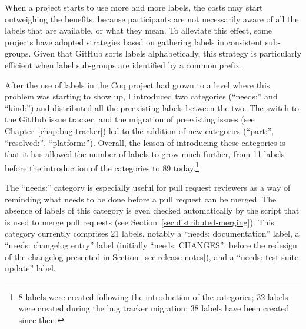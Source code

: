 When a project starts to use more and more labels, the costs may start outweighing the benefits, because participants are not necessarily aware of all the labels that are available, or what they mean. To alleviate this effect, some projects have adopted strategies based on gathering labels in consistent sub-groups. Given that GitHub sorts labels alphabetically, this strategy is particularly efficient when label sub-groups are identified by a common prefix.

After the use of labels in the Coq project had grown to a level where this problem was starting to show up, I introduced two categories (``needs:'' and ``kind:'') and distributed all the preexisting labels between the two.
The switch to the GitHub issue tracker, and the migration of preexisting issues (see Chapter~\ref{chap:bug-tracker}) led to the addition of new categories (``part:'', ``resolved:'', ``platform:''). 
Overall, the lesson of introducing these categories is that it has allowed the number of labels to grow much further, from 11 labels before the introduction of the categories to 89 today.\footnote{
	8 labels were created following the introduction of the categories; 32 labels were created during the bug tracker migration; 38 labels have been created since then.
}

The ``needs:'' category is especially useful for pull request reviewers as a way of reminding what needs to be done before a pull request can be merged. The absence of labels of this category is even checked automatically by the script that is used to merge pull requests (see Section~\ref{sec:distributed-merging}). This category currently comprises 21 labels, notably a ``needs: documentation'' label, a ``needs: changelog entry'' label (initially ``needs: CHANGES'', before the redesign of the changelog presented in Section~\ref{sec:release-notes}), and a ``needs: test-suite update'' label.


